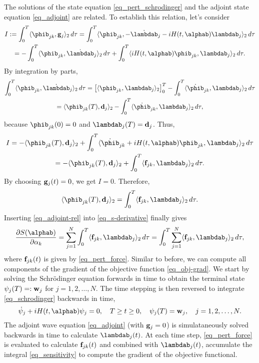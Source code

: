 \documentclass[11pt]{article}
\begin{document}
The solutions of the state equation \eqref{eq_pert_schrodinger} and the adjoint state equation
\eqref{eq_adjoint} are related. To establish this relation, let's consider
\begin{multline}
  I:= \int_0^T \langle \phib_{jk}, \gb_j \rangle_2\, d\tau =  \int_0^T \langle \phib_{jk},
  -\dot{\lambdab}_j - iH(t,\alphab)\lambdab_j \rangle_2\, d\tau \\
  =  -\int_0^T \langle  \phib_{jk},
  \dot{\lambdab}_{j} \rangle_2\, d\tau +  \int_0^T \langle iH(t,\alphab) \phib_{jk},\lambdab_j \rangle_2\, d\tau.
\end{multline}
By integration by parts,
\begin{multline*}
\int_0^T \langle  \phib_{jk}, \dot{\lambdab}_{j} \rangle_2\, d\tau =
%
\left[ \langle \phib_{jk}, \lambdab_j \rangle_2 \right]_0^T - \int_0^T \langle  \dot{\phib}_{jk},
\lambdab_{j} \rangle_2\, d\tau\\
%
= \langle \phib_{jk}(T), \db_j \rangle_2  - \int_0^T \langle  \dot{\phib}_{jk}, \lambdab_{j} \rangle_2\, d\tau,
\end{multline*}
because $\phib_{jk}(0)=0$ and $\lambdab_j(T) = \db_j$. Thus,
\begin{multline*}
I = -\langle \phib_{jk}(T), \db_j \rangle_2 + \int_0^T \langle \dot{\phib}_{jk} + iH(t,\alphab)
\phib_{jk},\lambdab_j \rangle_2\, d\tau\\
%
= -\langle \phib_{jk}(T), \db_j \rangle_2 + \int_0^T \langle \fb_{jk},\lambdab_j \rangle_2\, d\tau.
\end{multline*}
By choosing ${\mathbf g}_{j}(t)=0$, we get $I=0$. Therefore,
\begin{equation}\label{eq_adjoint-rel}
 \langle \phib_{jk}(T), \db_j \rangle_2 = \int_0^T \langle \fb_{jk},\lambdab_j \rangle_2\, d\tau.
\end{equation}
Inserting \eqref{eq_adjoint-rel} into \eqref{eq_s-derivative} finally gives
\begin{equation}\label{eq_sensitivity}
\frac{\p S(\alphab)}{\p \alpha_k} =
\sum_{j=1}^N \int_0^T  \langle \fb_{jk},\lambdab_j \rangle_2\,d\tau =
%
\int_0^T \sum_{j=1}^N \langle \fb_{jk},\lambdab_j \rangle_2\,d\tau,
\end{equation}
where ${\mathbf f}_{jk}(t)$ is given by \eqref{eq_pert_force}.  Similar to before, we can compute all
components of the gradient of the objective function \eqref{eq_obj-grad}. We start by solving the
Schr\"odinger equation forwards in time to obtain the terminal state ${\mathbf \psi}_j(T)=:{\mathbf w}_j$ for $j=1,2,\ldots,N$. The time stepping
is then reversed to integrate \eqref{eq_schrodinger} backwards in time,
\begin{equation}
\dot{\psib}_j + iH(t,\alphab)\psib_j=0,\quad T\geq t\geq 0, \quad \psib_j(T)=\wb_j,\quad j=1,2,\ldots,N.
\end{equation}
The adjoint wave equation \eqref{eq_adjoint}  (with ${\mathbf g}_j=0$) is simulataneously solved backwards in time to
calculate $\lambdab_j(t)$. At each time step, \eqref{eq_pert_force} is evaluated to calculate ${\mathbf f}_{jk}(t)$ and combined with
$\lambdab_j(t)$, accumulate the integral \eqref{eq_sensitivity} to compute the gradient of the
objective functional.
\end{document}

